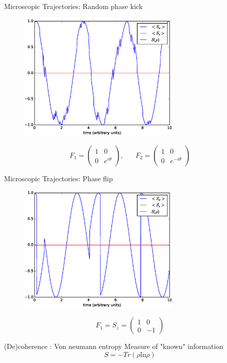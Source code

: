 \documentclass{beamer}
\begin{document}
\begin{frame}{Microscopic Trajectories: Random phase kick}
	\begin{figure}[h]
		\centering
		\includegraphics[width=0.7\textwidth]{figs/phase_jump_1.eps}
	\end{figure}
	\begin{equation*}
	F_1 =
	\begin{pmatrix}
	1 & 0 \\
	0 & e^{i\theta} 
	\end{pmatrix},\hspace{20pt}
	F_2 = 
	\begin{pmatrix}
	1 & 0 \\
	0 & e^{-i\theta} 
	\end{pmatrix}
	\end{equation*}
\end{frame}

\begin{frame}{Microscopic Trajectories: Phase flip}
	\begin{figure}[h]
		\centering
		\includegraphics[width=0.7\textwidth]{figs/phase_flip_1.eps}
	\end{figure}
	\begin{equation*}
	F_1 = S_z =
	\begin{pmatrix}
	1 & 0 \\
	0 & -1 
	\end{pmatrix}
	\end{equation*}
\end{frame}
\begin{frame}{(De)coherence : Von neumann entropy}
	Measure of "known" information
	\begin{equation}
	S = -Tr(\rho \text{ln}\rho)
	\end{equation}
\end{frame}
\end{document}
